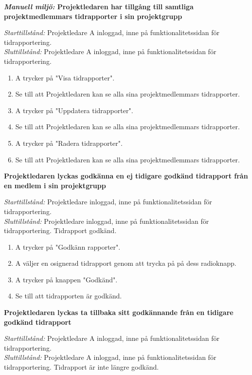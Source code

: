 \documentclass[a4paper]{article}
\begin{document}
\begin{FT}

\item
\textbf{\emph{Manuell miljö:} Projektledaren har tillgång till samtliga projektmedlemmars tidrapporter i sin projektgrupp}

\emph{Starttillstånd:} Projektledare A inloggad, inne på funktionalitetssidan för tidrapportering.\\
\emph{Sluttillstånd:} Projektledare A inloggad, inne på funktionalitetssidan för tidrapportering.

\begin{enumerate}
\item A trycker på "Visa tidrapporter".
\item Se till att Projektledaren kan se alla sina projektmedlemmars tidrapporter.
\item A trycker på "Uppdatera tidrapporter".
\item Se till att Projektledaren kan se alla sina projektmedlemmars tidrapporter.
\item A trycker på "Radera tidrapporter".
\item Se till att Projektledaren kan se alla sina projektmedlemmars tidrapporter.
\end{enumerate}

\item
\textbf{Projektledaren lyckas godkänna en ej tidigare godkänd tidrapport från en medlem i sin projektgrupp}

\emph{Starttillstånd:} Projektledare inloggad, inne på funktionalitetssidan för tidrapportering.\\
\emph{Sluttillstånd:} Projektledare inloggad, inne på funktionalitetssidan för tidrapportering. Tidrapport godkänd.

\begin{enumerate}
\item A trycker på "Godkänn rapporter".
\item A väljer en osignerad tidrapport genom att trycka på på dess radioknapp.
\item A trycker på knappen "Godkänd".
\item Se till att tidrapporten är godkänd.
\end{enumerate}

\item
\textbf{Projektledaren lyckas ta tillbaka sitt godkännande från en tidigare godkänd tidrapport}

\emph{Starttillstånd:} Projektledare A inloggad, inne på funktionalitetssidan för tidrapportering.\\
\emph{Sluttillstånd:} Projektledare A inloggad, inne på funktionalitetssidan för tidrapportering. Tidrapport är inte längre godkänd.


\end{FT}
\end{document}
